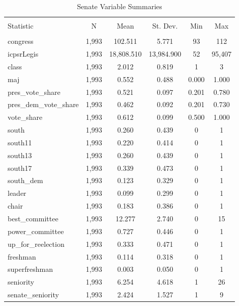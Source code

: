 \documentclass[12pt]{article}
\begin{document}
\begin{table}[H] \centering 
	\caption{Senate Variable Summaries} 
	\label{} 
	\begin{tabular}{@{\extracolsep{5pt}}lccccc} 
		\\[-1.8ex]\hline 
		\hline \\[-1.8ex] 
		Statistic & \multicolumn{1}{c}{N} & \multicolumn{1}{c}{Mean} & \multicolumn{1}{c}{St. Dev.} & \multicolumn{1}{c}{Min} & \multicolumn{1}{c}{Max} \\ 
		\hline \\[-1.8ex] 
		congress & 1,993 & 102.511 & 5.771 & 93 & 112 \\ 
		icpsrLegis & 1,993 & 18,808.510 & 13,984.900 & 52 & 95,407 \\ 
		class & 1,993 & 2.012 & 0.819 & 1 & 3 \\ 
		maj & 1,993 & 0.552 & 0.488 & 0.000 & 1.000 \\ 
		pres\_vote\_share & 1,993 & 0.521 & 0.097 & 0.201 & 0.780 \\ 
		pres\_dem\_vote\_share & 1,993 & 0.462 & 0.092 & 0.201 & 0.730 \\ 
		vote\_share & 1,993 & 0.612 & 0.099 & 0.500 & 1.000 \\ 
		south & 1,993 & 0.260 & 0.439 & 0 & 1 \\ 
		south11 & 1,993 & 0.220 & 0.414 & 0 & 1 \\ 
		south13 & 1,993 & 0.260 & 0.439 & 0 & 1 \\ 
		south17 & 1,993 & 0.339 & 0.473 & 0 & 1 \\ 
		south\_dem & 1,993 & 0.123 & 0.329 & 0 & 1 \\ 
		leader & 1,993 & 0.099 & 0.299 & 0 & 1 \\ 
		chair & 1,993 & 0.183 & 0.386 & 0 & 1 \\ 
		best\_committee & 1,993 & 12.277 & 2.740 & 0 & 15 \\ 
		power\_committee & 1,993 & 0.727 & 0.446 & 0 & 1 \\ 
		up\_for\_reelection & 1,993 & 0.333 & 0.471 & 0 & 1 \\ 
		freshman & 1,993 & 0.114 & 0.318 & 0 & 1 \\ 
		superfreshman & 1,993 & 0.003 & 0.050 & 0 & 1 \\ 
		seniority & 1,993 & 6.254 & 4.618 & 1 & 26 \\ 
		senate\_seniority & 1,993 & 2.424 & 1.527 & 1 & 9 \\ 

\end{tabular}
\end{table}
\end{document}
